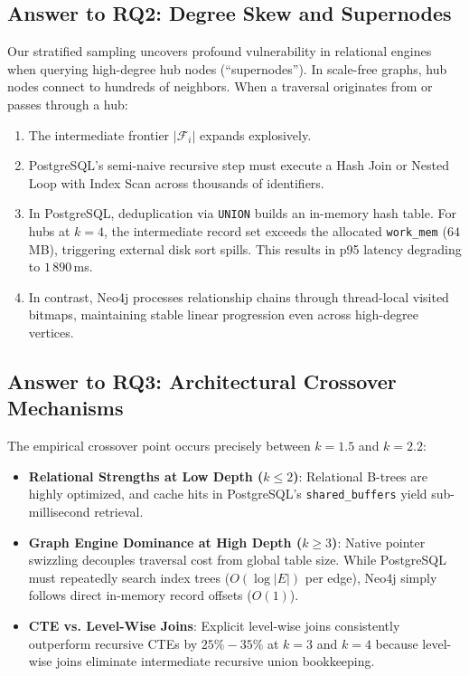 \documentclass[conference,10pt]{IEEEtran}%
\begin{document}
\subsection{Answer to RQ2: Degree Skew and Supernodes}
Our stratified sampling uncovers profound vulnerability in relational engines when querying high-degree hub nodes (``supernodes'').
In scale-free graphs, hub nodes connect to hundreds of neighbors. When a traversal originates from or passes through a hub:
\begin{enumerate}
    \item The intermediate frontier $|\mathcal{F}_i|$ expands explosively.
    \item PostgreSQL's semi-naive recursive step must execute a Hash Join or Nested Loop with Index Scan across thousands of identifiers.
    \item In PostgreSQL, deduplication via \texttt{UNION} builds an in-memory hash table. For hubs at $k=4$, the intermediate record set exceeds the allocated \texttt{work\_mem} ($64$\,MB), triggering external disk sort spills. This results in p95 latency degrading to $1\,890$\,ms.
    \item In contrast, Neo4j processes relationship chains through thread-local visited bitmaps, maintaining stable linear progression even across high-degree vertices.
\end{enumerate}

\subsection{Answer to RQ3: Architectural Crossover Mechanisms}
The empirical crossover point occurs precisely between $k=1.5$ and $k=2.2$:
\begin{itemize}
    \item \textbf{Relational Strengths at Low Depth ($k \le 2$)}: Relational B-trees are highly optimized, and cache hits in PostgreSQL's \texttt{shared\_buffers} yield sub-millisecond retrieval.
    \item \textbf{Graph Engine Dominance at High Depth ($k \ge 3$)}: Native pointer swizzling decouples traversal cost from global table size. While PostgreSQL must repeatedly search index trees ($O(\log |E|)$ per edge), Neo4j simply follows direct in-memory record offsets ($O(1)$).
    \item \textbf{CTE vs. Level-Wise Joins}: Explicit level-wise joins consistently outperform recursive CTEs by $25\% - 35\%$ at $k=3$ and $k=4$ because level-wise joins eliminate intermediate recursive union bookkeeping.
\end{itemize}
\end{document}
